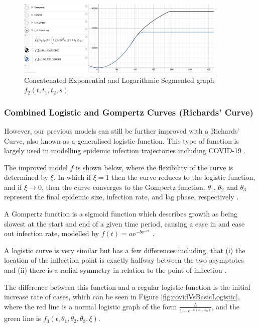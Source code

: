 \documentclass[a4paper,titlepage]{article}
\begin{document}
\begin{figure}[htbp]
    \centering
    \includegraphics[width=10cm]{f2ExpoLog.png}
    \caption{Concatenated Exponential and Logarithmic Segmented graph $f_2(t,t_{1},t_{2},s)$}
    \label{fig:f2ExpoLog}
\end{figure}

\subsubsection{Combined Logistic and Gompertz Curves (Richards' Curve)}

However, our previous models can still be further improved with a Richards' Curve, also known as a generalised logistic function. This type of function is largely used in modelling epidemic infection trajectories including COVID-19 \cite{spreadcurves_lee_lei_mallick_2020}.

The improved model $f$ is shown below, where the flexibility of the curve is determined by $\xi$. In which if $\xi=1$ then the curve reduces to the logistic function, and if $\xi\to0$, then the curve converges to the Gompertz function. $\theta_1$, $\theta_2$ and $\theta_3$ represent the final epidemic size, infection rate, and lag phase, respectively \cite{richard_wikipedia_2021}.

A Gompertz function is a sigmoid function which describes growth as being slowest at the start and end of a given time period, causing a ease in and ease out infection rate, modelled by $f(t)=a\mathrm {e} ^{-b\mathrm {e} ^{-ct}}$ \cite{gompertz_wikipedia_2021}.

A logistic curve is very similar but has a few differences including, that (i) the location of the inflection point is exactly halfway between the two asymptotes and (ii) there is a radial symmetry in relation to the point of inflection \cite{logistic_10.2307/2347021}.

The difference between this function and a regular logistic function is the initial increase rate of cases, which can be seen in Figure \ref{fig:covidVsBasicLogistic}, where the red line is a normal logistic graph of the form $\frac {L}{1+e^{-k(x-x_{0})}}$, and the green line is $f_3(t,\theta_1,\theta_2,\theta_3,\xi)$.
\end{document}
